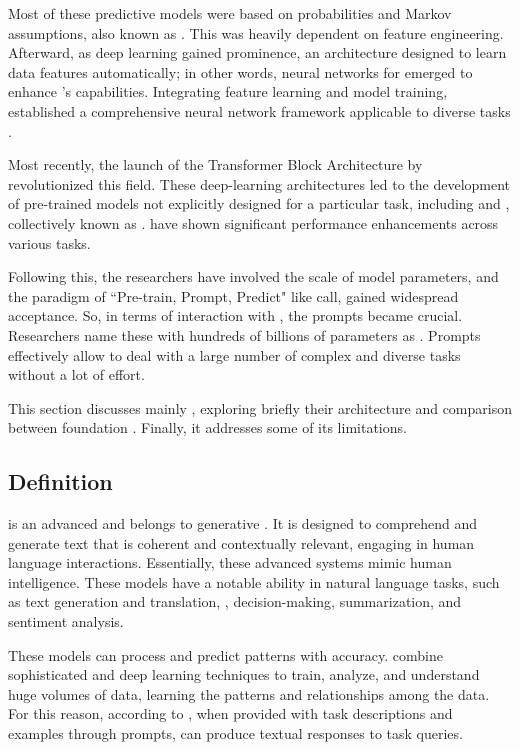 Most of these predictive models were based on probabilities and Markov assumptions, also known as {\slm}. This was heavily dependent on feature engineering. Afterward, as deep learning gained prominence, an architecture designed to learn data features automatically; in other words, neural networks for {\nlp} emerged to enhance {\lm}’s capabilities. Integrating feature learning and model training, {\nlm} established a comprehensive neural network framework applicable to diverse {\nlp} tasks \cite{liu_prompting_nodate}.

Most recently, the launch of the Transformer Block Architecture by \citet{vaswani_attention_2023} revolutionized this field. These deep-learning architectures led to the development of pre-trained models not explicitly designed for a particular task, including {\bert} and {\gpt}, collectively known as {\plm}. {\plm} have shown significant performance enhancements across various {\nlp} tasks.

Following this, the researchers have involved the scale of model parameters, and the paradigm of “Pre-train, Prompt, Predict" like \citet{liu_prompting_nodate} call, gained widespread acceptance. So, in terms of interaction with {\lm}, the prompts became crucial. Researchers name these {\plm} with hundreds of billions of parameters as {\llm}. Prompts effectively allow {\llm} to deal with a large number of complex and diverse tasks without a lot of effort.

This section discusses mainly {\llm}, exploring briefly their architecture and comparison between foundation {\llm}. Finally, it addresses some of its limitations.


\subsection{Definition}

{\llm} is an advanced {\lm} and belongs to generative {\ai}. It is designed to comprehend and generate text that is coherent and contextually relevant, engaging in human language interactions. Essentially, these advanced {\ai} systems mimic human intelligence. These models have a notable ability in natural language tasks, such as text generation and translation, {\qa}, decision-making, summarization, and sentiment analysis.

These models can process and predict patterns with accuracy. \citet{hadi_LLM_2023} combine sophisticated {\slm} and deep learning techniques to train, analyze, and understand huge volumes of data, learning the patterns and relationships among the data. For this reason, according to \citet{naveed_comprehensive_2023}, when provided with task descriptions and examples through prompts, {\llm} can produce textual responses to task queries. 

